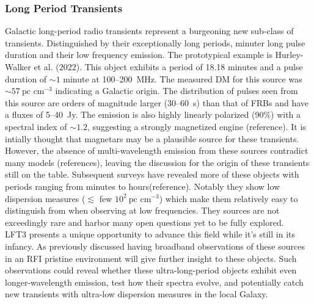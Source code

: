 \subsubsection{Long Period Transients}

Galactic long-period radio transients represent a burgeoning new sub-class of transients. Distinguished by their exceptionally long periods, minuter long pulse duration and their low frequency emission. The prototypical example is Hurley-Walker et al. (2022). This object exhibits a period of 18.18 minutes and a pulse duration of $\sim 1$ minute at 100--200~MHz. The measured DM for this source was $\sim57~\text{pc cm}^{-3}$ indicating a Galactic origin. The distribution of pulses seen from this source are orders of magnitude larger (30--60~s) than that of FRBs and have a fluxes of 5--40~Jy. The emission is also highly linearly polarized (90\%) with a spectral index of $\sim 1.2$, suggesting a strongly magnetized engine (reference). It is intially thought that magnetars may be a plausible source for these transients. However, the absence of multi-wavelength emission from these sources contradict many models (references), leaving the discussion for the origin of these transients still on the table. Subsequent surveys have revealed more of these objects with periods ranging from minutes to hours(reference). Notably they show low dispersion measures ($\lesssim$ few $10^2~\text{pc cm}^{-3}$) which make them relatively easy to distinguish from when observing at low frequencies. They sources are not exceedingly rare and harbor many open questions yet to be fully explored. \\ 
LFT3 presents a unique opportunity to advance this field while it's still in its infancy. As previously discussed having broadband observations of these sources in an RFI pristine environment will give further insight to these objects. Such observations could reveal whether these ultra-long-period objects exhibit even longer-wavelength emission, test how their spectra evolve, and potentially catch new transients with ultra-low dispersion measures in the local Galaxy. 

